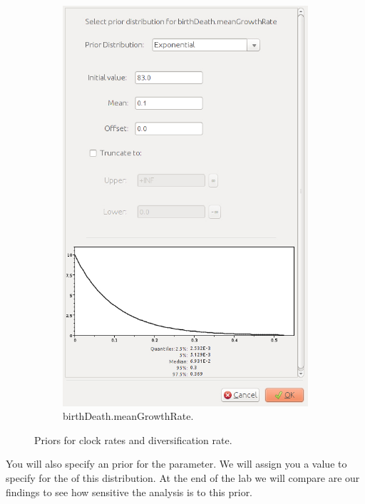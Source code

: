 {\begin{figure}[htbp]
        \begin{subfigure}[b]{0.325\textwidth}
            \includegraphics[width=\textwidth]{../screenshots/beauti-prior-birthrate.jpg}
            \caption{birthDeath.meanGrowthRate.}
            \label{fig:beautiPriorsBirthRate}
        \end{subfigure}
        \caption{Priors for clock rates and diversification rate.}
        \label{fig:beautiPriorsClocks}
    \end{figure}

    You will also specify an  prior for the
     parameter.
    {\color{red}We will assign you a value to specify for the  of
    this distribution.}
    At the end of the lab we will compare are our findings to see how sensitive
    the analysis is to this prior.
}

